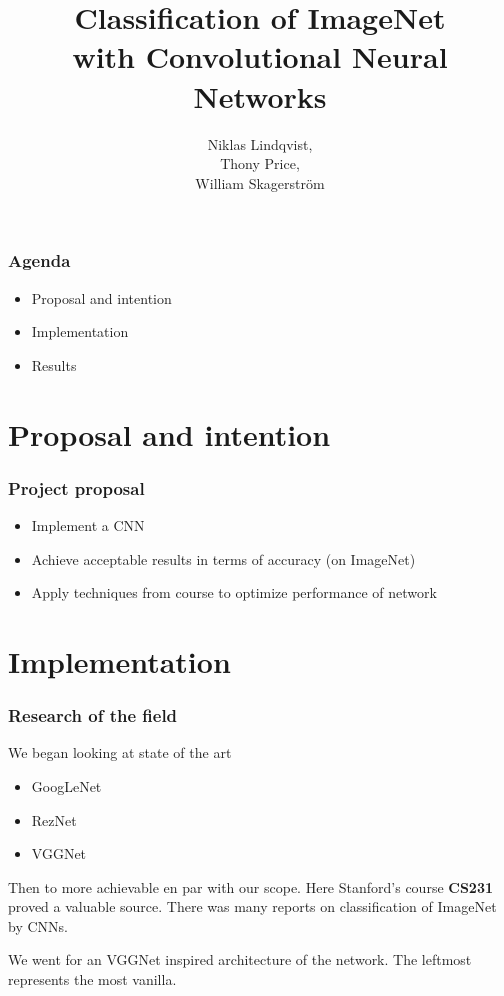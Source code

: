\documentclass{beamer}
\title{
  Classification of ImageNet \\
  with Convolutional Neural Networks
}
\author{
  Niklas Lindqvist,\\
  Thony Price,\\
  William Skagerström\\
}
\begin{document}
\maketitle

\begin{frame}
  \frametitle{Agenda}

  \begin{itemize}
    \item Proposal and intention
    \item Implementation
    \item Results
  \end{itemize}
\end{frame}

\section{Proposal and intention}
\begin{frame}
  \frametitle{Project proposal}
  \begin{itemize}
	  \item Implement a CNN
    \item Achieve acceptable results in terms of accuracy (on ImageNet)
    \item Apply techniques from course to optimize performance of network
  \end{itemize}
\end{frame}

\section{Implementation}
\begin{frame}
  \frametitle{Research of the field}
  We began looking at state of the art
  \begin{itemize}
    \item GoogLeNet
    \item RezNet
    \item VGGNet
  \end{itemize}

  Then to more achievable en par with our scope. Here Stanford's course \textbf{CS231} proved a valuable source. There was many reports on classification of ImageNet by CNNs.
\end{frame}

\begin{frame}
  We went for an VGGNet inspired architecture of the network. The leftmost represents the most vanilla.
  
\end{frame}
\end{document}
